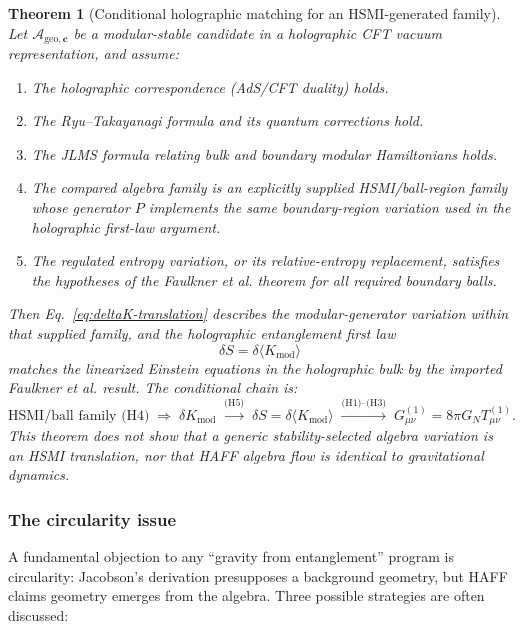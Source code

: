 \documentclass[12pt,a4paper]{article}
\newtheorem{theorem}{Theorem}[section]
\begin{document}
\begin{theorem}[Conditional holographic matching for an HSMI-generated family]
\label{thm:linearized}
Let $\mathcal{A}_{\mathrm{geo},\mathbf{c}}$ be a modular-stable candidate in a holographic CFT vacuum representation, and assume:
\begin{enumerate}
\item[(H1)] The holographic correspondence (AdS/CFT duality) holds.
\item[(H2)] The Ryu--Takayanagi formula and its quantum corrections hold.
\item[(H3)] The JLMS formula relating bulk and boundary modular Hamiltonians holds.
\item[(H4)] The compared algebra family is an explicitly supplied HSMI/ball-region family whose generator $P$ implements the same boundary-region variation used in the holographic first-law argument.
\item[(H5)] The regulated entropy variation, or its relative-entropy replacement, satisfies the hypotheses of the Faulkner et al. theorem for all required boundary balls.
\end{enumerate}
Then Eq.~\eqref{eq:deltaK-translation} describes the modular-generator variation within that supplied family, and the holographic entanglement first law
\begin{equation}
\delta S = \delta\langle K_{\mathrm{mod}}\rangle
\end{equation}
matches the linearized Einstein equations in the holographic bulk by the imported Faulkner et al. result.  The conditional chain is:
\begin{equation}
\text{HSMI/ball family (H4)}
\;\Longrightarrow\;\delta K_{\mathrm{mod}}
\;\xrightarrow{\text{(H5)}}\;
\delta S=\delta\langle K_{\mathrm{mod}}\rangle
\;\xrightarrow{\text{(H1)--(H3)}}\;
G_{\mu\nu}^{(1)}=8\pi G_NT_{\mu\nu}^{(1)}.
\end{equation}
This theorem does not show that a generic stability-selected algebra variation is an HSMI translation, nor that HAFF algebra flow is identical to gravitational dynamics.
\end{theorem}

\subsubsection{The circularity issue}

A fundamental objection to any ``gravity from entanglement'' program is circularity: Jacobson's derivation \cite{Jacobson1995} presupposes a background geometry, but HAFF claims geometry emerges from the algebra.
Three possible strategies are often discussed:
\end{document}

